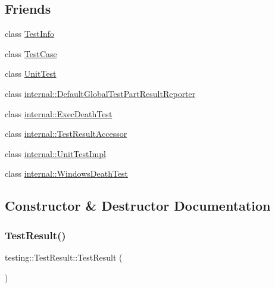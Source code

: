 \subsection*{Friends}
\begin{DoxyCompactItemize}
\item 
class \hyperlink{classtesting_1_1_test_result_a4c49c2cdb6c328e6b709b4542f23de3c}{Test\+Info}
\item 
class \hyperlink{classtesting_1_1_test_result_aff779e55b06adfa7c0088bd10253f0f0}{Test\+Case}
\item 
class \hyperlink{classtesting_1_1_test_result_a832b4d233efee1a32feb0f4190b30d39}{Unit\+Test}
\item 
class \hyperlink{classtesting_1_1_test_result_abae39633da9932847b41cb80efd62115}{internal\+::\+Default\+Global\+Test\+Part\+Result\+Reporter}
\item 
class \hyperlink{classtesting_1_1_test_result_adf5553cae6aea6f8648d47e299237e34}{internal\+::\+Exec\+Death\+Test}
\item 
class \hyperlink{classtesting_1_1_test_result_ae762da04e74a0d3b0daded3c5bd4a8e8}{internal\+::\+Test\+Result\+Accessor}
\item 
class \hyperlink{classtesting_1_1_test_result_acc0a5e7573fd6ae7ad1878613bb86853}{internal\+::\+Unit\+Test\+Impl}
\item 
class \hyperlink{classtesting_1_1_test_result_a6aeedc04a0590fcc1b3c5f687dbb0f9f}{internal\+::\+Windows\+Death\+Test}
\end{DoxyCompactItemize}


\subsection{Constructor \& Destructor Documentation}
\mbox{\label{classtesting_1_1_test_result_a5cf5dd6f416b7334ea601aab21a2fda5}} 
\subsubsection{\texorpdfstring{Test\+Result()}{TestResult()}}
{\footnotesize\ttfamily testing\+::\+Test\+Result\+::\+Test\+Result (\begin{DoxyParamCaption}{ }\end{DoxyParamCaption})}

